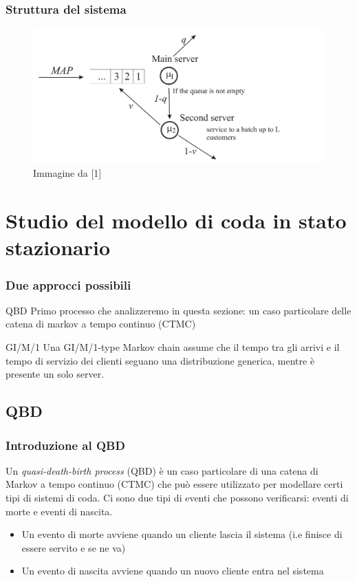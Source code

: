 \documentclass{beamer}
\begin{document}
\begin{frame}
    \frametitle{Struttura del sistema}
    \begin{figure}[h]
        \centering
        \includegraphics[width=\textwidth]{hVQg024.png}
        \caption{Immagine da [1]}
        \label{fig:diagramma_di_stato}
    \end{figure}
\end{frame}

\section{Studio del modello di coda in stato stazionario}

\begin{frame}
    \frametitle{Due approcci possibili}

    \begin{block}{QBD}
        Primo processo che analizzeremo in  questa sezione: un caso particolare delle catena di markov a tempo continuo (CTMC)
    \end{block}

    \begin{block}{GI/M/1}
        Una GI/M/1-type Markov chain assume che il tempo tra gli arrivi e il tempo di servizio dei clienti seguano una distribuzione generica, mentre è presente un solo server.
    \end{block}

\end{frame}

\subsection{QBD}


\begin{frame}
    \frametitle{Introduzione al QBD}
    \begin{block}{}
        Un \emph{quasi-death-birth process} (QBD) è un caso particolare di una catena di Markov a tempo continuo (CTMC) che può essere utilizzato per modellare certi tipi di sistemi di coda. Ci sono due tipi di eventi che possono verificarsi: eventi di morte e eventi di nascita.
    \end{block}
    \begin{itemize}
        \item Un evento di morte avviene quando un cliente lascia il sistema (i.e finisce di essere servito e se ne va)
        \item Un evento di nascita avviene quando un nuovo cliente entra nel sistema
    \end{itemize}
\end{frame}
\end{document}
